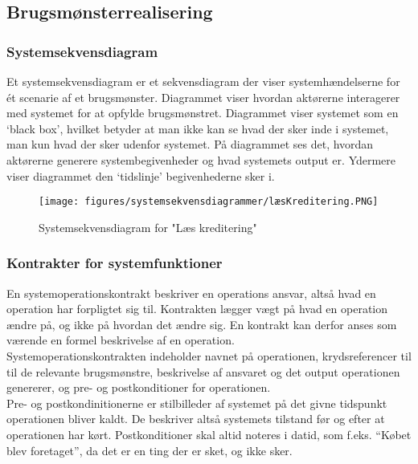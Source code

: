 \subsection{Brugsmønsterrealisering}

\subsubsection{Systemsekvensdiagram}
Et systemsekvensdiagram er et sekvensdiagram der viser systemhændelserne for ét scenarie af et
brugsmønster. Diagrammet viser hvordan aktørerne interagerer med systemet for at opfylde
brugsmønstret. Diagrammet viser systemet som en ‘black box’, hvilket betyder at man ikke kan se
hvad der sker inde i systemet, man kun hvad der sker udenfor systemet. På diagrammet ses det,
hvordan aktørerne generere systembegivenheder og hvad systemets output er. Ydermere viser
diagrammet den ‘tidslinje’ begivenhederne sker i. \\


\begin{figure}[h]
\centering
\texttt{[image: figures/systemsekvensdiagrammer/læsKreditering.PNG]}
\caption{Systemsekvensdiagram for "Læs kreditering"}
\label{fig:read_credit}
\end{figure}


\subsubsection{Kontrakter for systemfunktioner}
En systemoperationskontrakt beskriver en operations ansvar, altså hvad en operation har forpligtet
sig til. Kontrakten lægger vægt på hvad en operation ændre på, og ikke på hvordan det
ændre sig. En kontrakt kan derfor anses som værende en formel beskrivelse af en operation.\\
Systemoperationskontrakten indeholder navnet på operationen, krydsreferencer til til de relevante
brugsmønstre, beskrivelse af ansvaret og det output operationen genererer, og pre- og
postkonditioner for operationen. \\
Pre- og postkondinitionerne er stilbilleder af systemet på det givne tidspunkt operationen bliver
kaldt. De beskriver altså systemets tilstand før og efter at operationen har kørt. Postkonditioner skal
altid noteres i datid, som f.eks. “Købet blev foretaget”, da det er en ting der er sket, og ikke sker.\\

